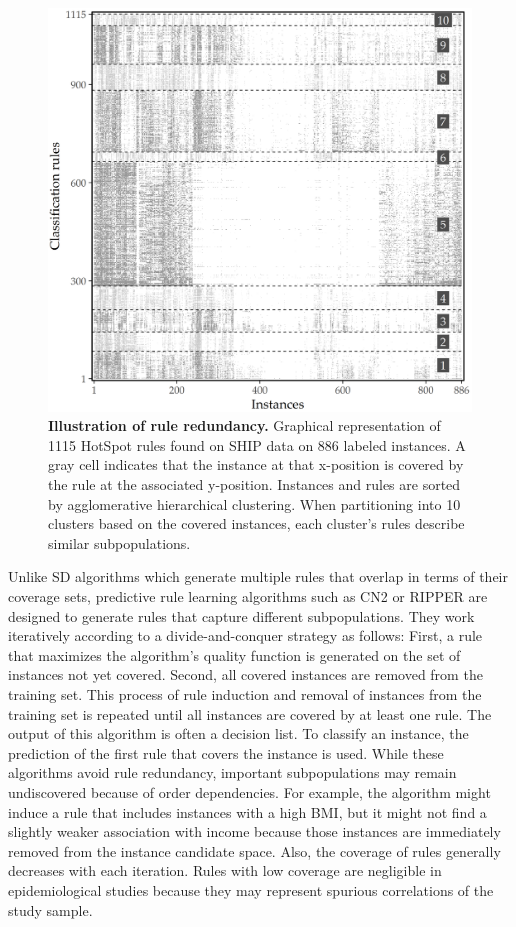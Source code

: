 \documentclass[
  oneside]{book}
\begin{document}
\begin{figure}[htb]

{\centering \includegraphics[width=0.75\linewidth]{figures/04-rule-overlap-heatmap} 

}

\caption{\textbf{Illustration of rule redundancy.} Graphical representation of 1115 HotSpot rules found on SHIP data on 886 labeled instances. A gray cell indicates that the instance at that x-position is covered by the rule at the associated y-position. Instances and rules are sorted by agglomerative hierarchical clustering. When partitioning into 10 clusters based on the covered instances, each cluster's rules describe similar subpopulations.}\label{fig:04-rule-overlap-heatmap}
\end{figure}

Unlike SD algorithms which generate multiple rules that overlap in terms of their coverage sets, predictive rule learning algorithms such as CN2 \autocite{Clark:CN289} or RIPPER \autocite{Cohen:RIPPER95} are designed to generate rules that capture different subpopulations.
They work iteratively according to a divide-and-conquer strategy \autocite{Fuernkranz:12} as follows:
First, a rule that maximizes the algorithm's quality function is generated on the set of instances not yet covered.
Second, all covered instances are removed from the training set.
This process of rule induction and removal of instances from the training set is repeated until all instances are covered by at least one rule.
The output of this algorithm is often a decision list.
To classify an instance, the prediction of the first rule that covers the instance is used.
While these algorithms avoid rule redundancy, important subpopulations may remain undiscovered because of order dependencies.
For example, the algorithm might induce a rule that includes instances with a high BMI, but it might not find a slightly weaker association with income because those instances are immediately removed from the instance candidate space.
Also, the coverage of rules generally decreases with each iteration.
Rules with low coverage are negligible in epidemiological studies because they may represent spurious correlations of the study sample.
\end{document}
